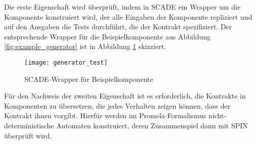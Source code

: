 Die erste Eigenschaft wird überprüft, indem in SCADE ein Wrapper um die Komponente konstruiert wird, der alle Eingaben der Komponente repliziert und auf den Ausgaben die Tests durchführt, die der Kontrakt spezifiziert.
Der entsprechende Wrapper für die Beispielkomponente aus Abbildung \ref{fig:example_generator} ist in Abbildung \ref{fig:example_generator_test} skizziert.
\begin{figure}
  \centering
  \texttt{[image: generator\_test]}
  \caption{SCADE-Wrapper für Beispielkomponente}
  \label{fig:example_generator_test}
\end{figure}

Für den Nachweis der zweiten Eigenschaft ist es erforderlich, die Kontrakte in Komponenten zu übersetzen, die jedes Verhalten zeigen können, dass der Kontrakt ihnen vorgibt.
Hierfür werden im Promela-Formalismus nicht-deterministische Automaten konstruiert, deren Zusammenspiel dann mit SPIN überprüft wird.
